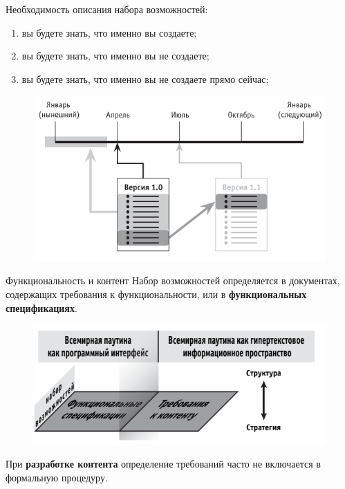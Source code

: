 \documentclass{beamer}
\begin{document}
\begin{frame}[t]
Необходимость описания набора возможностей:
\begin{enumerate}
\item вы будете знать, что именно вы создаете;
\item вы будете знать, что именно вы не создаете;
\item вы будете знать, что именно вы не создаете прямо сейчас;
\end{enumerate}
\begin{figure}[h]
\centering
\includegraphics[scale=0.5]{images/lec02-pic02.png}
\end{figure}
\end{frame}  

\begin{frame}[t]{Функциональность и контент}
Набор возможностей определяется в документах, содержащих требования к функциональности, или в \textbf{функциональных спецификациях}.
\begin{figure}[h]
\centering
\includegraphics[scale=0.5]{images/lec02-pic03.png}
\end{figure}
При \textbf{разработке контента }определение требований часто не включается в формальную процедуру.
\end{frame} 
\end{document}
